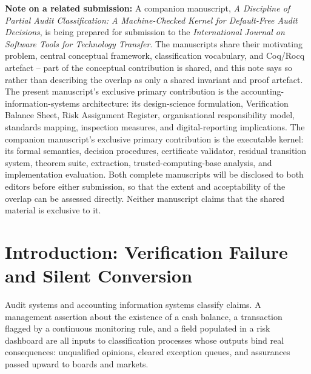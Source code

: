 \documentclass[11pt,a4paper]{article}
\theoremstyle{definition}
\theoremstyle{remark}
\begin{document}
\medskip
\noindent\textbf{Note on a related submission:} A companion manuscript, \emph{A Discipline of Partial Audit Classification: A Machine-Checked Kernel for Default-Free Audit Decisions}, is being prepared for submission to the \emph{International Journal on Software Tools for Technology Transfer}. The manuscripts share their motivating problem, central conceptual framework, classification vocabulary, and Coq/Rocq artefact -- part of the conceptual contribution is shared, and this note says so rather than describing the overlap as only a shared invariant and proof artefact. The present manuscript's exclusive primary contribution is the accounting-information-systems architecture: its design-science formulation, Verification Balance Sheet, Risk Assignment Register, organisational responsibility model, standards mapping, inspection measures, and digital-reporting implications. The companion manuscript's exclusive primary contribution is the executable kernel: its formal semantics, decision procedures, certificate validator, residual transition system, theorem suite, extraction, trusted-computing-base analysis, and implementation evaluation. Both complete manuscripts will be disclosed to both editors before either submission, so that the extent and acceptability of the overlap can be assessed directly. Neither manuscript claims that the shared material is exclusive to it.

\section{Introduction: Verification Failure and Silent Conversion}
\label{sec:intro}

Audit systems and accounting information systems classify claims. A management assertion about the existence of a cash balance, a transaction flagged by a continuous monitoring rule, and a field populated in a risk dashboard are all inputs to classification processes whose outputs bind real consequences: unqualified opinions, cleared exception queues, and assurances passed upward to boards and markets.
\end{document}
